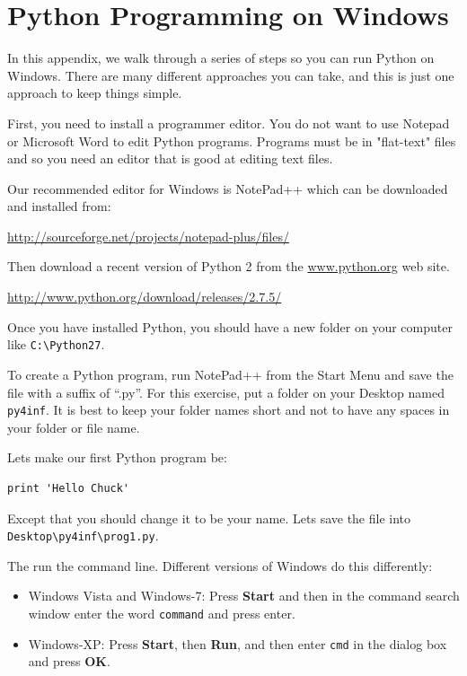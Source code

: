 \documentclass[11pt]{book}
\begin{document}
\appendix

\chapter{Python Programming on Windows}

In this appendix, we walk through a series of steps
so you can run Python on Windows.  There are many different 
approaches you can take, and this is just one
approach to keep things simple.

First, you need to install a programmer editor.  You
do not want to use Notepad or Microsoft Word to edit
Python programs.  Programs must be in "flat-text" files
and so you need an editor that is good at
editing text files.

Our recommended editor for Windows is NotePad++ which
can be downloaded and installed from:

\url{http://sourceforge.net/projects/notepad-plus/files/}

Then download a recent version of Python 2 from the
\url{www.python.org} web site.

\url{http://www.python.org/download/releases/2.7.5/}

Once you have installed Python, you should have a new
folder on your computer like {\tt C:{\textbackslash}Python27}.

To create a Python program, run NotePad++ from the Start Menu
and save the file with a suffix of ``.py''.  For this
exercise, put a folder on your Desktop named 
{\tt py4inf}.  It is best to keep your folder names short
and not to have any spaces in your folder or file name.

Lets make our first Python program be:

\beforeverb
\begin{verbatim}
print 'Hello Chuck'
\end{verbatim}
\afterverb
%
Except that you should change it to be your name.  Lets
save the file into {\tt Desktop{\textbackslash}py4inf{\textbackslash}prog1.py}.

The run the command line.  Different versions of Windows
do this differently:

\begin{itemize}
\item Windows Vista and Windows-7: Press {\bf Start}
and then in the command search window enter the word
{\tt command} and press enter.

\item Windows-XP: Press {\bf Start}, then {\bf Run}, and 
then enter {\tt cmd} in the dialog box and press {\bf OK}.
\end{itemize}
\end{document}
